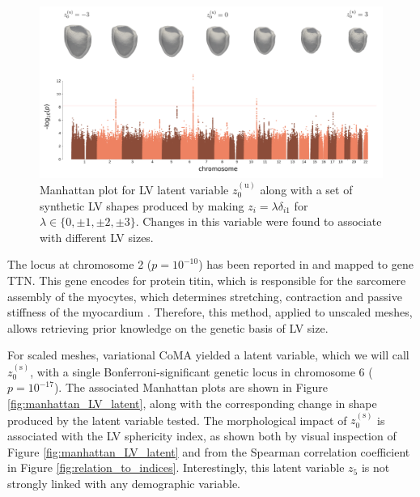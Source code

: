 \begin{figure}[ht!]
\includegraphics[width=\textwidth]{figs/gwas/GWAS_Experiment2_z0u_unscaled_meshes.png}
\caption{Manhattan plot for LV latent variable $z_0^{(\text{u})}$ along with a set of synthetic LV shapes produced by making $z_i=\lambda \delta_{i1}$ for $\lambda\in\{0, \pm 1, \pm 2, \pm 3\}$. Changes in this variable were found to associate with different LV sizes.}
\label{fig:manhattan_LV_latent_unscaled}
\end{figure}

The locus at chromosome 2 ($p=10^{-10}$) has been reported in  \cite{ref_nayaung, ref_pirruccello} and mapped to gene TTN. This gene encodes for protein titin, which is  responsible  for  the  sarcomere  assembly of the myocytes, which determines stretching, contraction and passive stiffness of the myocardium \cite{granzier_giant_2004}. Therefore, this method, applied to unscaled meshes, allows retrieving prior knowledge on the genetic basis of LV size.

For scaled meshes, variational CoMA yielded a latent variable, which we will call $z_0^{(\text{s})}$, with a single Bonferroni-significant genetic locus in chromosome 6 ($p=10^{-17}$). The associated Manhattan plots are shown in Figure \ref{fig:manhattan_LV_latent}, along with the corresponding change in shape produced by the latent variable tested. The morphological impact of $z_0^{(\text{s})}$ is associated with the LV sphericity index, as shown both by visual inspection of Figure \ref{fig:manhattan_LV_latent} and from the Spearman correlation coefficient in Figure \ref{fig:relation_to_indices}. Interestingly, this latent variable $z_5$ is not strongly linked with any demographic variable.

